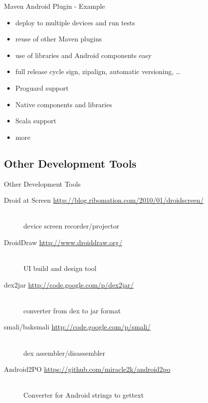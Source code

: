 \documentclass[aspectratio=169]{beamer}
\newcommand{\surl}[1] {{\tiny \url{#1}}}
\begin{document}
    \begin{frame}{Maven Android Plugin - Example}
      \begin{itemize}
        \item deploy to multiple devices and run tests
        \item reuse of other Maven plugins
        \item use of libraries and Android components easy
        \item full release cycle sign, zipalign, automatic versioning, \dots
        \item Proguard support
        \item Native components and libraries
        \item Scala support
        \item more
      \end{itemize}
    \end{frame}

  \subsection{Other Development Tools}

    \begin{frame}{Other Development Tools}
      \begin{description}
        \item[Droid at Screen \surl{http://blog.ribomation.com/2010/01/droidscreen/}] \hfill \\ device screen recorder/projector 

        \item[DroidDraw \surl{http://www.droiddraw.org/}] \hfill \\  UI build and design tool 
 
        \item[dex2jar \surl{http://code.google.com/p/dex2jar/}] \hfill \\ converter from dex to jar format 

        \item[smali/baksmali \surl{http://code.google.com/p/smali/}] \hfill \\ dex assembler/disassembler 

        \item[Android2PO \surl{https://github.com/miracle2k/android2po}] \hfill \\ Converter for Android strings to gettext 
      \end{description}
   \end{frame}
\end{document}
